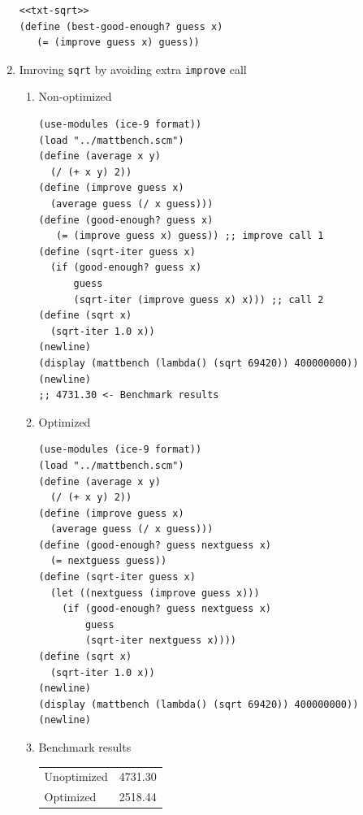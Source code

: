 \documentclass[final,fleqn,titlepage,twoside]{article}
\begin{document}
\begin{enumerate}
\begin{verbatim}
<<txt-sqrt>>
(define (best-good-enough? guess x)
   (= (improve guess x) guess))
\end{verbatim}

\item Imroving \texttt{sqrt} by avoiding extra \texttt{improve} call
\label{sec:org39dfa11}
\begin{enumerate}
\item Non-optimized
\label{sec:org2f56043}
\begin{verbatim}
(use-modules (ice-9 format))
(load "../mattbench.scm")
(define (average x y)
  (/ (+ x y) 2))
(define (improve guess x)
  (average guess (/ x guess)))
(define (good-enough? guess x)
   (= (improve guess x) guess)) ;; improve call 1
(define (sqrt-iter guess x)
  (if (good-enough? guess x)
      guess
      (sqrt-iter (improve guess x) x))) ;; call 2
(define (sqrt x)
  (sqrt-iter 1.0 x))
(newline)
(display (mattbench (lambda() (sqrt 69420)) 400000000))
(newline)
;; 4731.30 <- Benchmark results
\end{verbatim}

\item Optimized
\label{sec:org79d494a}
\begin{verbatim}
(use-modules (ice-9 format))
(load "../mattbench.scm")
(define (average x y)
  (/ (+ x y) 2))
(define (improve guess x)
  (average guess (/ x guess)))
(define (good-enough? guess nextguess x)
  (= nextguess guess))
(define (sqrt-iter guess x)
  (let ((nextguess (improve guess x)))
    (if (good-enough? guess nextguess x)
        guess
        (sqrt-iter nextguess x))))
(define (sqrt x)
  (sqrt-iter 1.0 x))
(newline)
(display (mattbench (lambda() (sqrt 69420)) 400000000))
(newline)
\end{verbatim}

\item Benchmark results
\label{sec:orgf68aaef}
\begin{center}
\begin{tabular}{lr}
Unoptimized & 4731.30\\[0pt]
Optimized & 2518.44\\[0pt]
\end{tabular}
\end{center}
\end{enumerate}
\end{enumerate}
\end{document}
